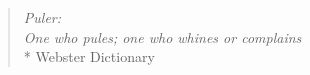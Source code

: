 \phantom{.}
\vspace{4in}

\begin{singlespace}
\begin{quote}
  \textit{Puler:}\\
  \textit{One who pules; one who whines or complains}\\*
  \hfill{Webster Dictionary}
\end{quote}
\end{singlespace}

%
